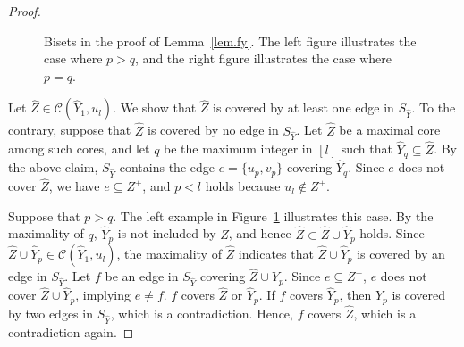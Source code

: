 \documentclass[11pt]{article}
\newcommand{\Cfam}{\mathcal{C}}
\begin{document}
\begin{proof}
\begin{figure}[t]

 \caption{Bisets in the proof of Lemma~\ref{lem.fy}. The left figure
illustrates the case where $p > q$, and the right figure illustrates the
 case where $p=q$.}
 \label{fig.lemmafy}
\end{figure}

 Let $\hat{Z} \in \Cfam(\hat{Y}_1,u_{l})$.
 We show that $\hat{Z}$ is covered by at least one edge in $S_{\hat{Y}}$.
  To the contrary,
 suppose that $\hat{Z}$  is 
 covered by no edge in $S_{\hat{Y}}$.
 Let $\hat{Z}$ be a maximal core among such cores,
 and let $q$ be the maximum integer in $[l]$ such that 
 $\hat{Y}_q \subseteq \hat{Z}$.
 By the above claim, $S_{\hat{Y}}$ contains the edge
 $e=\{u_{p},v_{p}\}$ covering $\hat{Y}_q$.
 Since $e$ does not cover $\hat{Z}$, we have $e \subseteq Z^+$, and
 $p < l$ holds because $u_{l}\not\in Z^+$.

 Suppose that $p>q$.
 The left example in Figure~\ref{fig.lemmafy}
 illustrates this case.
 By the maximality of $q$, 
 $\hat{Y}_{p}$ is not included by $\hat{Z}$, and hence
 $\hat{Z} \subset \hat{Z}\cup \hat{Y}_{p}$ holds.
 Since $\hat{Z} \cup \hat{Y}_p \in \Cfam(\hat{Y}_1,u_l)$,
 the maximality of $\hat{Z}$ indicates that
 $\hat{Z}\cup \hat{Y}_{p}$ is covered by an edge in $S_{\hat{Y}}$.
 Let
 $f$ be an edge in $S_{\hat{Y}}$ covering $\hat{Z}\cup \hat{Y}_{p}$.
 Since $e \subseteq Z^+$, $e$ does not cover
 $\hat{Z}\cup \hat{Y}_{p}$, implying $e \neq f$.
 $f$ covers $\hat{Z}$ or $\hat{Y}_{p}$.
 If $f$ covers $\hat{Y}_{p}$, then
 $\hat{Y}_p$ is covered by two edges in $S_{\hat{Y}}$, which is a contradiction.
 Hence, $f$ covers $\hat{Z}$, which is a contradiction again.


\end{proof}
\end{document}
